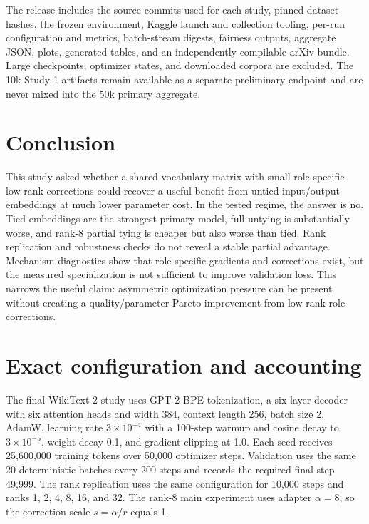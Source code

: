 \documentclass[11pt]{article}
\begin{document}
The release includes the source commits used for each study, pinned dataset hashes, the frozen environment, Kaggle launch and collection tooling, per-run configuration and metrics, batch-stream digests, fairness outputs, aggregate JSON, plots, generated tables, and an independently compilable arXiv bundle. Large checkpoints, optimizer states, and downloaded corpora are excluded. The 10k Study 1 artifacts remain available as a separate preliminary endpoint and are never mixed into the 50k primary aggregate.

\section{Conclusion}

This study asked whether a shared vocabulary matrix with small role-specific low-rank corrections could recover a useful benefit from untied input/output embeddings at much lower parameter cost. In the tested regime, the answer is no. Tied embeddings are the strongest primary model, full untying is substantially worse, and rank-8 partial tying is cheaper but also worse than tied. Rank replication and robustness checks do not reveal a stable partial advantage. Mechanism diagnostics show that role-specific gradients and corrections exist, but the measured specialization is not sufficient to improve validation loss. This narrows the useful claim: asymmetric optimization pressure can be present without creating a quality/parameter Pareto improvement from low-rank role corrections.

\appendix

\section{Exact configuration and accounting}

The final WikiText-2 study uses GPT-2 BPE tokenization, a six-layer decoder with six attention heads and width 384, context length 256, batch size 2, AdamW, learning rate $3\times10^{-4}$ with a 100-step warmup and cosine decay to $3\times10^{-5}$, weight decay 0.1, and gradient clipping at 1.0. Each seed receives 25,600,000 training tokens over 50,000 optimizer steps. Validation uses the same 20 deterministic batches every 200 steps and records the required final step 49,999. The rank replication uses the same configuration for 10,000 steps and ranks 1, 2, 4, 8, 16, and 32. The rank-8 main experiment uses adapter $\alpha=8$, so the correction scale $s=\alpha/r$ equals 1.
\end{document}
